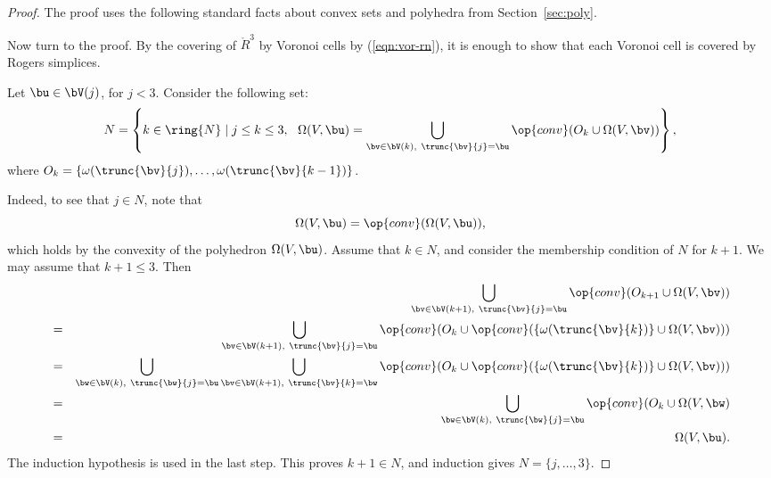 \begin{proof} 
The proof uses the following standard facts about convex sets and polyhedra from
Section~\ref{sec:poly}.


%
Now turn to the proof.  
By the covering of $\ring{R}^3$  by Voronoi cells by (\ref{eqn:vor-rn}),
it is enough to show that each Voronoi cell is covered by Rogers simplices.

Let $\bu\in \bV(j)$, for $j<3$.
Consider the following set:
\begin{displaymath} 
N = \left\{k\in\ring{N}\mid j\le k\le 3, ~~\Omega(V,\bu) 
= \bigcup_{\bv \in \bV(k),~\trunc{\bv}{j}=\bu}
\op{conv}(O_k \cup\Omega(V,\bv)) %
\right\},
\end{displaymath}
where $O_k = \{\omega(\trunc{\bv}{j}),\ldots,\omega(\trunc{\bv}{k-1})\}$.

  Indeed, to see that $j\in N$, note that
\begin{displaymath} 
\Omega(V,\bu) = \op{conv}(\Omega(V,\bu)),
\end{displaymath}
which holds by the convexity of the polyhedron $\Omega(V,\bu)$.
Assume that $k\in N$, and consider the membership condition of $N$  for
$k+1$.  We may assume that $k+1\le 3$.
Then
\begin{eqnarray*} 
&\phantom{=}&\bigcup _{\bv \in \bV(k+1),~\trunc{\bv}{j}=\bu}
\op{conv}(O_{k+1} \cup\Omega(V,\bv))
%
\vspace{6pt}\\
&=&\bigcup _{\bv \in \bV(k+1),~\trunc{\bv}{j}=\bu}
\op{conv}(O_{k} \cup\op{conv}(\{\omega(\trunc{\bv}{k})\}\cup\Omega(V,\bv)))
\vspace{6pt}\\
&=&\bigcup _{\bw\in \bV(k),~\trunc{\bw}{j}=\bu}
\bigcup_{\bv \in \bV(k+1),~\trunc{\bv}{k}=\bw}
\op{conv}(O_{k} \cup\op{conv}(\{\omega(\trunc{\bv}{k})\}\cup\Omega(V,\bv)))
\vspace{6pt}\\
&=&\bigcup _{\bw\in \bV(k),~\trunc{\bw}{j}=\bu}
\op{conv}(O_{k} \cup \Omega(V,\bw)    
\vspace{6pt}\\
&=&\quad\Omega(V,\bu).
\end{eqnarray*}
The induction hypothesis is used in the last step.  
This proves $k+1\in N$, and induction gives $N=\{j,\ldots,3\}$.


\end{proof}
